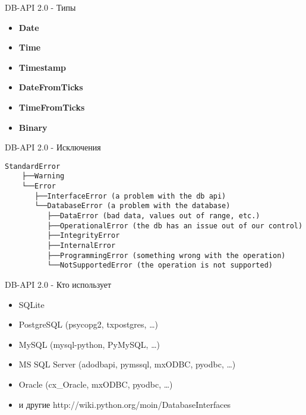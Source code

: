 \begin{frame}{DB-API 2.0 - Типы}

  \begin{itemize}

    \item \textbf{Date}
    \item \textbf{Time}
    \item \textbf{Timestamp}
    \item \textbf{DateFromTicks}
    \item \textbf{TimeFromTicks}
    \item \textbf{Binary}

  \end{itemize}

\end{frame}

\begin{frame}[fragile]{DB-API 2.0 - Исключения}

    \begin{lstlisting}[style=python]
    StandardError
    ├──Warning
    └──Error
       ├──InterfaceError (a problem with the db api)
       └──DatabaseError (a problem with the database)
          ├──DataError (bad data, values out of range, etc.)
          ├──OperationalError (the db has an issue out of our control)
          ├──IntegrityError
          ├──InternalError
          ├──ProgrammingError (something wrong with the operation)
          └──NotSupportedError (the operation is not supported)
    \end{lstlisting}

\end{frame}

\begin{frame}{DB-API 2.0 - Кто использует}

  \begin{itemize}

    \item SQLite
    \item PostgreSQL (psycopg2, txpostgres, …)
    \item MySQL (mysql-python, PyMySQL, …)
    \item MS SQL Server (adodbapi, pymssql, mxODBC, pyodbc, …)
    \item Oracle (cx\_Oracle, mxODBC, pyodbc, …)
    \item и другие http://wiki.python.org/moin/DatabaseInterfaces

  \end{itemize}

\end{frame}


